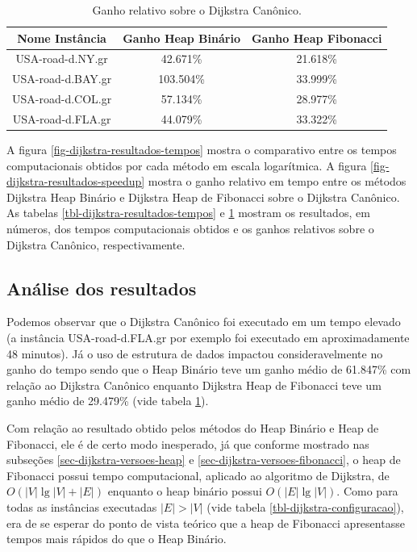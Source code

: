 \begin{table}[H]
\caption{Ganho relativo sobre o Dijkstra Canônico.}
\label{tbl-dijkstra-resultados-speedup}
\centering
\begin{adjustbox}{max width=\textwidth}
\begin{tabular}{|c|c|c|}
\hline
\textbf{Nome Instância} & \textbf{Ganho Heap Binário} & \textbf{Ganho Heap Fibonacci} \\ \hline
USA-road-d.NY.gr        & 42.671\%                       & 21.618\%                         \\ \hline
USA-road-d.BAY.gr       & 103.504\%                      & 33.999\%                         \\ \hline
USA-road-d.COL.gr       & 57.134\%                       & 28.977\%                         \\ \hline
USA-road-d.FLA.gr       & 44.079\%                       & 33.322\%                         \\ \hline
\end{tabular}
\end{adjustbox}
\end{table}

A figura \ref{fig-dijkstra-resultados-tempos} mostra o comparativo entre os tempos computacionais obtidos por cada método em escala logarítmica. A figura \ref{fig-dijkstra-resultados-speedup} mostra o ganho relativo em tempo entre os métodos Dijkstra Heap Binário e Dijkstra Heap de Fibonacci sobre o Dijkstra Canônico. As tabelas \ref{tbl-dijkstra-resultados-tempos} e \ref{tbl-dijkstra-resultados-speedup} mostram os resultados, em números, dos tempos computacionais obtidos e os ganhos relativos sobre o Dijkstra Canônico, respectivamente.

\subsection{Análise dos resultados}
\label{sec-dijkstra-experimentos-analise}
Podemos observar que o Dijkstra Canônico foi executado em um tempo elevado (a instância USA-road-d.FLA.gr por exemplo foi executado em aproximadamente 48 minutos). Já o uso de estrutura de dados impactou consideravelmente no ganho do tempo sendo que o Heap Binário teve um ganho médio de 61.847\% com relação ao Dijkstra Canônico enquanto Dijkstra Heap de Fibonacci teve um ganho médio de 29.479\% (vide tabela \ref{tbl-dijkstra-resultados-speedup}).

Com relação ao resultado obtido pelos métodos do Heap Binário e Heap de Fibonacci, ele é de certo modo inesperado, já que conforme mostrado nas subseções \ref{sec-dijkstra-versoes-heap} e \ref{sec-dijkstra-versoes-fibonacci}, o heap de Fibonacci possui tempo computacional, aplicado ao algoritmo de Dijkstra, de $O(|V|\lg |V| + |E|)$ enquanto o heap binário possui $O(|E| \lg |V|)$.  Como para todas as instâncias executadas $|E| > |V|$ (vide tabela \ref{tbl-dijkstra-configuracao}), era de se esperar do ponto de vista teórico que a heap de Fibonacci apresentasse tempos mais rápidos do que o Heap Binário.

